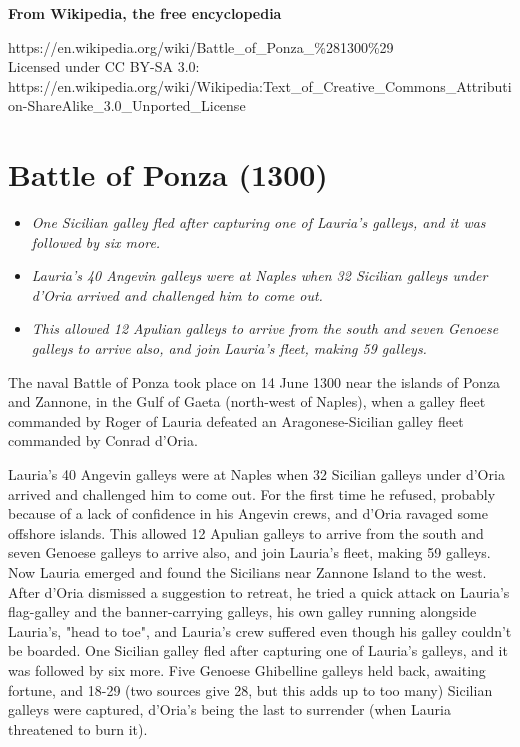 \textbf{From Wikipedia, the free encyclopedia}

https://en.wikipedia.org/wiki/Battle\_of\_Ponza\_\%281300\%29\\
Licensed under CC BY-SA 3.0:\\
https://en.wikipedia.org/wiki/Wikipedia:Text\_of\_Creative\_Commons\_Attribution-ShareAlike\_3.0\_Unported\_License

\section{Battle of Ponza (1300)}\label{battle-of-ponza-1300}

\begin{itemize}
\item
  \emph{One Sicilian galley fled after capturing one of Lauria's
  galleys, and it was followed by six more.}
\item
  \emph{Lauria's 40 Angevin galleys were at Naples when 32 Sicilian
  galleys under d'Oria arrived and challenged him to come out.}
\item
  \emph{This allowed 12 Apulian galleys to arrive from the south and
  seven Genoese galleys to arrive also, and join Lauria's fleet, making
  59 galleys.}
\end{itemize}

The naval Battle of Ponza took place on 14 June 1300 near the islands of
Ponza and Zannone, in the Gulf of Gaeta (north-west of Naples), when a
galley fleet commanded by Roger of Lauria defeated an Aragonese-Sicilian
galley fleet commanded by Conrad d'Oria.

Lauria's 40 Angevin galleys were at Naples when 32 Sicilian galleys
under d'Oria arrived and challenged him to come out. For the first time
he refused, probably because of a lack of confidence in his Angevin
crews, and d'Oria ravaged some offshore islands. This allowed 12 Apulian
galleys to arrive from the south and seven Genoese galleys to arrive
also, and join Lauria's fleet, making 59 galleys. Now Lauria emerged and
found the Sicilians near Zannone Island to the west. After d'Oria
dismissed a suggestion to retreat, he tried a quick attack on Lauria's
flag-galley and the banner-carrying galleys, his own galley running
alongside Lauria's, "head to toe", and Lauria's crew suffered even
though his galley couldn't be boarded. One Sicilian galley fled after
capturing one of Lauria's galleys, and it was followed by six more. Five
Genoese Ghibelline galleys held back, awaiting fortune, and 18-29 (two
sources give 28, but this adds up to too many) Sicilian galleys were
captured, d'Oria's being the last to surrender (when Lauria threatened
to burn it).

